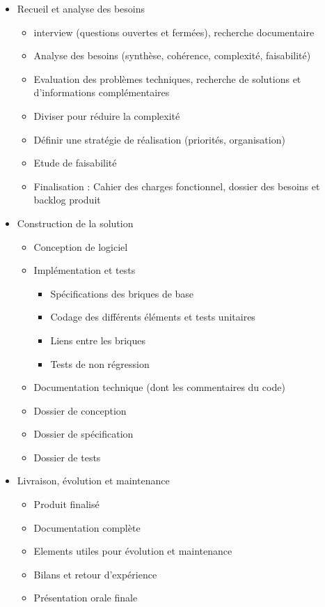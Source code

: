 \begin{itemize}
	\item Recueil et analyse des besoins 
		\begin{itemize}
			\item interview (questions ouvertes et fermées), recherche documentaire
			\item Analyse des besoins (synthèse, cohérence, complexité, faisabilité)
			\item Evaluation des problèmes techniques, recherche de solutions et d'informations complémentaires
			\item Diviser pour réduire la complexité
			\item Définir une stratégie de réalisation (priorités, organisation)
			\item Etude de faisabilité
			\item Finalisation : Cahier des charges fonctionnel, dossier des besoins et backlog produit
		\end{itemize}
	\item Construction de la solution
		\begin{itemize}
			\item Conception de logiciel
			\item Implémentation et tests
			\begin{itemize}
				\item Spécifications des briques de base
				\item Codage des différents éléments et tests unitaires
				\item Liens entre les briques
				\item Tests de non régression
			\end{itemize}
			\item Documentation technique (dont les commentaires du code)
			\item Dossier de conception
			\item Dossier de spécification
			\item Dossier de tests
		\end{itemize}
	\item Livraison, évolution et maintenance
	\begin{itemize}
		\item Produit finalisé
		\item Documentation complète
		\item Elements utiles pour évolution et maintenance
		\item Bilans et retour d'expérience
		\item Présentation orale finale
	\end{itemize}
\end{itemize}

